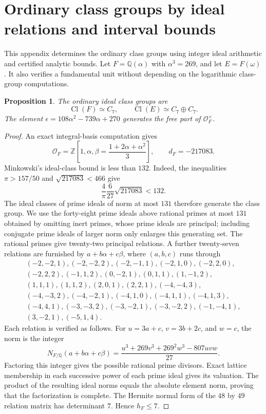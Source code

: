 \documentclass[11pt]{article}
\newtheorem{proposition}[theorem]{Proposition}
\theoremstyle{remark}\newtheorem{remark}[theorem]{Remark}
\begin{document}
\section{Ordinary class groups by ideal relations and interval bounds}
This appendix determines the ordinary class groups using integer ideal arithmetic and certified analytic bounds.
Let $F=\mathbb Q(\alpha)$ with $\alpha^3=269$, and let $E=F(\omega)$.
It also verifies a fundamental unit without depending on the logarithmic class-group computations.
\begin{proposition}
The ordinary ideal class groups are
\[
 \operatorname{Cl}(F)\simeq C_7,\qquad
 \operatorname{Cl}(E)\simeq C_7\oplus C_7.
\]
The element $\epsilon=108\alpha^2-739\alpha+270$ generates the free part of $\mathcal O_F^\times$.
\end{proposition}
\begin{proof}
An exact integral-basis computation gives
\[
 \mathcal O_F=\mathbb Z\left[1,\alpha,
 \beta=\frac{1+2\alpha+\alpha^2}{3}\right],\qquad
 d_F=-217083.
\]
Minkowski's ideal-class bound \citep[Theorem~4.3]{MilneANT2020} is less than $132$.
Indeed, the inequalities $\pi>157/50$ and $\sqrt{217083}<466$ give
\[
 \frac4\pi\frac6{27}\sqrt{217083}<132.
\]
The ideal classes of prime ideals of norm at most $131$ therefore generate the class group.
We use the forty-eight prime ideals above rational primes at most $131$ obtained by omitting inert primes, whose prime ideals are principal; including conjugate prime ideals of larger norm only enlarges this generating set.
The rational primes give twenty-two principal relations.
A further twenty-seven relations are furnished by $a+b\alpha+c\beta$, where $(a,b,c)$ runs through
\[
\begin{gathered}
(-2,-2,1),(-2,-2,2),(-2,-1,1),(-2,1,0),(-2,2,0),\\
(-2,2,2),(-1,1,2),(0,-2,1),(0,1,1),(1,-1,2),\\
(1,1,1),(1,1,2),(2,0,1),(2,2,1),(-4,-4,3),\\
(-4,-3,2),(-4,-2,1),(-4,1,0),(-4,1,1),(-4,1,3),\\
(-4,4,1),(-3,-3,2),(-3,-2,1),(-3,-2,2),(-1,-4,1),\\
(3,-2,1),(-5,1,4).
\end{gathered}
\]
Each relation is verified as follows. For $u=3a+c$, $v=3b+2c$, and $w=c$, the norm is the integer
\[
 N_{F/\mathbb Q}(a+b\alpha+c\beta)
 =\frac{u^3+269v^3+269^2w^3-807uvw}{27}.
\]
Factoring this integer gives the possible rational prime divisors. Exact lattice membership in each successive power of each prime ideal gives its valuation. The product of the resulting ideal norms equals the absolute element norm, proving that the factorization is complete. The Hermite normal form of the $48$ by $49$ relation matrix has determinant $7$. Hence $h_F\leq7$.


\end{proof}
\end{document}
